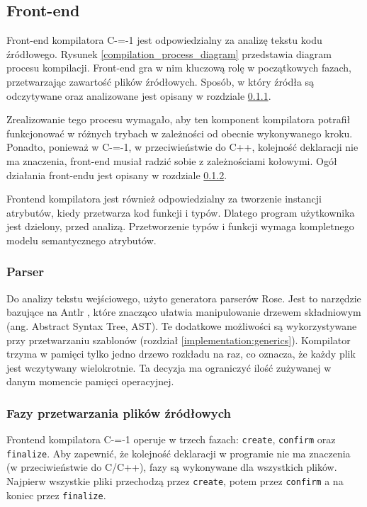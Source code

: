 \subsection{Front-end}
Front-end kompilatora C-=-1 jest odpowiedzialny za analizę tekstu kodu źródłowego. Rysunek \ref{compilation_process_diagram} przedstawia diagram procesu kompilacji.
Front-end gra w nim kluczową rolę w początkowych fazach, przetwarzając zawartość plików źródłowych.
Sposób, w który źródła są odczytywane oraz analizowane jest opisany w rozdziale \ref{implementation:parser}.

Zrealizowanie tego procesu wymagało, aby ten komponent kompilatora potrafił funkcjonować w różnych trybach w zależności od obecnie wykonywanego kroku.
Ponadto, ponieważ w C-=-1, w przeciwieństwie do C++, kolejność deklaracji nie ma znaczenia, front-end musiał radzić sobie z zależnościami kołowymi.
Ogół działania front-endu jest opisany w rozdziale \ref{implementation:source_processing_phases}.

Frontend kompilatora jest również odpowiedzialny za tworzenie instancji atrybutów, kiedy przetwarza kod funkcji i typów.
Dlatego program użytkownika jest dzielony, przed analizą.
Przetworzenie typów i funkcji wymaga kompletnego modelu semantycznego atrybutów.

\subsubsection{Parser}
\label{implementation:parser}
Do analizy tekstu wejściowego, użyto generatora parserów Rose\cite{grabski2020}.
Jest to narzędzie bazujące na Antlr \cite{antlr}, które znacząco ułatwia manipulowanie drzewem składniowym (ang. Abstract Syntax Tree, AST).
Te dodatkowe możliwości są wykorzystywane przy przetwarzaniu szablonów (rozdział \ref{implementation:generics}).
Kompilator trzyma w pamięci tylko jedno drzewo rozkładu na raz, co oznacza, że każdy plik jest wczytywany wielokrotnie.
Ta decyzja ma ograniczyć ilość zużywanej w danym momencie pamięci operacyjnej.

\subsubsection{Fazy przetwarzania plików źródłowych}
\label{implementation:source_processing_phases}

Frontend kompilatora C-=-1 operuje w trzech fazach: \lstinline{create}, \lstinline{confirm} oraz \lstinline{finalize}.
Aby zapewnić, że kolejność deklaracji w programie nie ma znaczenia (w przeciwieństwie do C/C++), fazy są wykonywane dla wszystkich plików.
Najpierw wszystkie pliki przechodzą przez \lstinline{create}, potem przez \lstinline{confirm} a na koniec przez \lstinline{finalize}.


